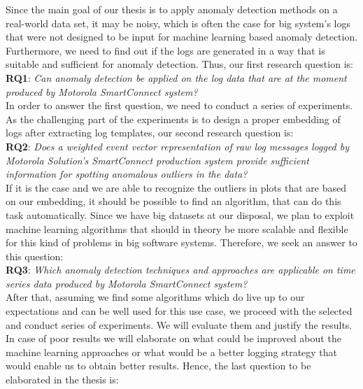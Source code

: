Since the main goal of our thesis is to apply anomaly detection methods on a real-world data set, it may be noisy, which is often the case for big system's logs that were not designed to be input for machine learning based anomaly detection. 
Furthermore, we need to find out if the logs are generated in a way that is suitable and sufficient for anomaly detection. Thus, our first research question is:\\

\textbf{RQ1}: \textit{Can anomaly detection be applied on the log data that are at the moment produced by Motorola SmartConnect system?}\\
    
In order to answer the first question, we need to conduct a series of experiments. As the challenging part of the experiments is to design a proper embedding of logs after extracting log templates, our second research question is:\\ 

\textbf{RQ2}: \textit{Does a weighted event vector representation of raw log messages logged by Motorola Solution's SmartConnect production system provide sufficient information for spotting anomalous outliers in the data?}\\

If it is the case and we are able to recognize the outliers in plots that are based on our embedding, it should be possible to find an algorithm, that can do this task automatically. Since we have big datasets at our disposal, we plan to exploit machine learning algorithms that should in theory be more scalable and flexible for this kind of problems in big software systems.
Therefore, we seek an answer to this question:\\


\textbf{RQ3}: \textit{Which anomaly detection techniques and approaches are applicable on time series data produced by Motorola SmartConnect system?}\\
    
After that, assuming we find some algorithms which do live up to our expectations and can be well used for this use case, we proceed with the selected and conduct series of experiments.
We will evaluate them and justify the results. In case of poor results we will elaborate on what could be improved about the machine learning approaches or what would be a better logging strategy that would enable us to obtain better results.
Hence, the last question to be elaborated in the thesis is:\\

